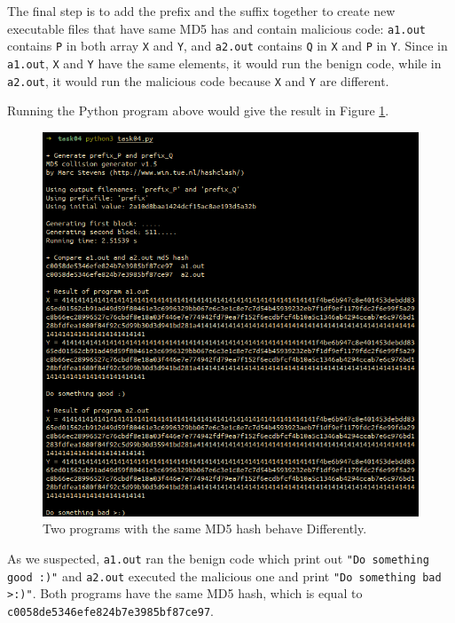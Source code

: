 \documentclass{article}
\begin{document}
The final step is to add the prefix and the suffix together to create new executable
files that have same MD5 has and contain malicious code: \texttt{a1.out} contains \texttt{P}
in both array \texttt{X} and \texttt{Y}, and \texttt{a2.out} contains \texttt{Q} in \texttt{X}
and \texttt{P} in \texttt{Y}. Since in \texttt{a1.out}, \texttt{X} and \texttt{Y}
have the same elements, it would run the benign code, while in \texttt{a2.out},
it would run the malicious code because \texttt{X} and \texttt{Y} are different.

Running the Python program above would give the result in Figure \ref{fig:task4_result}.

\begin{figure}[!ht]
    \centering
    \includegraphics[scale=0.5]{task4.2.png}
    \caption{Two programs with the same MD5 hash behave Differently.}
    \label{fig:task4_result}
\end{figure}

As we suspected, \texttt{a1.out} ran the benign code which print out \texttt{"Do
something good :)"} and \texttt{a2.out} executed the malicious one and print
\texttt{"Do something bad >:)"}. Both programs have the same MD5 hash, which is
equal to \texttt{c0058de5346efe824b7e3985bf87ce97}.
\end{document}
